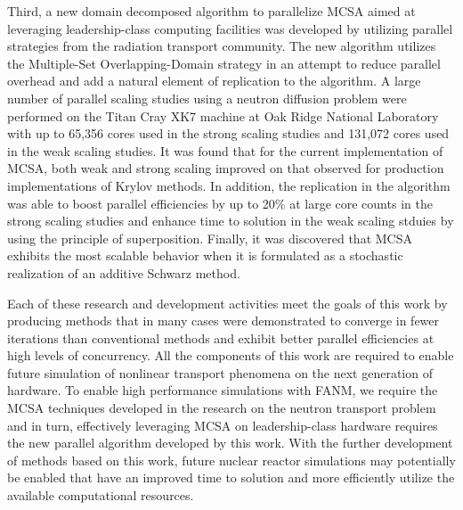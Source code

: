 Third, a new domain decomposed algorithm to parallelize MCSA aimed at
leveraging leadership-class computing facilities was developed by
utilizing parallel strategies from the radiation transport
community. The new algorithm utilizes the Multiple-Set
Overlapping-Domain strategy in an attempt to reduce parallel overhead
and add a natural element of replication to the algorithm. A large
number of parallel scaling studies using a neutron diffusion problem
were performed on the Titan Cray XK7 machine at Oak Ridge National
Laboratory with up to 65,356 cores used in the strong scaling studies
and 131,072 cores used in the weak scaling studies. It was found that
for the current implementation of MCSA, both weak and strong scaling
improved on that observed for production implementations of Krylov
methods. In addition, the replication in the algorithm was able to
boost parallel efficiencies by up to 20\% at large core counts in the
strong scaling studies and enhance time to solution in the weak
scaling stduies by using the principle of superposition. Finally, it
was discovered that MCSA exhibits the most scalable behavior when it
is formulated as a stochastic realization of an additive Schwarz
method.

Each of these research and development activities meet the goals of
this work by producing methods that in many cases were demonstrated to
converge in fewer iterations than conventional methods and exhibit
better parallel efficiencies at high levels of concurrency. All the
components of this work are required to enable future simulation of
nonlinear transport phenomena on the next generation of hardware. To
enable high performance simulations with FANM, we require the MCSA
techniques developed in the research on the neutron transport problem
and in turn, effectively leveraging MCSA on leadership-class hardware
requires the new parallel algorithm developed by this work. With the
further development of methods based on this work, future nuclear
reactor simulations may potentially be enabled that have an improved
time to solution and more efficiently utilize the available
computational resources.
